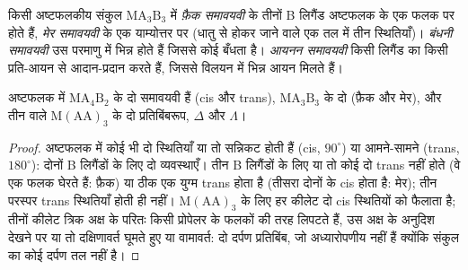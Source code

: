 \begin{definition}[संकुलों के समावयवी]\label{def:b2:coordination-complexes:isomers}
किसी अष्टफलकीय संकुल $\mathrm{MA_3B_3}$ में \emph{फ़ैक समावयवी} के
तीनों B लिगैंड अष्टफलक के एक फलक पर होते हैं, \emph{मेर
समावयवी} के एक याम्योत्तर पर (धातु से होकर जाने वाले एक तल में
तीन स्थितियाँ)। \emph{बंधनी समावयवी} उस परमाणु में भिन्न होते हैं जिससे
कोई  बँधता है। \emph{आयनन समावयवी}
किसी लिगैंड का किसी प्रति-आयन से आदान-प्रदान करते हैं, जिससे विलयन में भिन्न आयन मिलते हैं।
\end{definition}

\begin{proposition}\label{prop:b2:coordination-complexes:isomer-count}
अष्टफलक में $\mathrm{MA_4B_2}$ के दो समावयवी हैं (cis और trans), $\mathrm{MA_3B_3}$ के दो
(फ़ैक और मेर), और तीन  वाले $\mathrm M(\mathrm{AA})_3$ के दो
प्रतिबिंबरूप, $\Delta$ और $\Lambda$।
\end{proposition}

\begin{proof}
अष्टफलक में कोई भी दो स्थितियाँ या तो सन्निकट होती हैं (cis, $90^\circ$) या आमने-सामने
(trans, $180^\circ$): दोनों B लिगैंडों के लिए दो व्यवस्थाएँ। तीन B लिगैंडों के लिए
या तो कोई दो trans नहीं होते (वे एक फलक घेरते हैं: फ़ैक) या ठीक एक युग्म trans होता है (तीसरा
दोनों के cis होता है: मेर); तीन परस्पर trans स्थितियाँ होती ही नहीं।
$\mathrm M(\mathrm{AA})_3$ के लिए हर कीलेट दो cis स्थितियों को फैलाता है; तीनों कीलेट
त्रिक अक्ष के परितः किसी प्रोपेलर के फलकों की तरह लिपटते हैं, उस अक्ष के अनुदिश देखने पर
या तो दक्षिणावर्त घूमते हुए या वामावर्त: दो दर्पण प्रतिबिंब, जो अध्यारोपणीय नहीं हैं
क्योंकि संकुल का कोई दर्पण तल नहीं है।
\end{proof}

